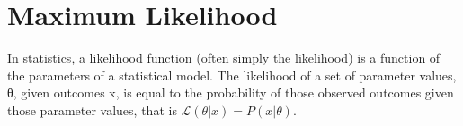 \section{Maximum Likelihood}

In statistics, a likelihood function (often simply the likelihood) is a function of the parameters of a statistical model. 
The likelihood of a set of parameter values, θ, given outcomes x, is equal to the probability of those 
observed outcomes given those parameter values, that is $\mathcal{L}(\theta |x) = P(x | \theta)$.

